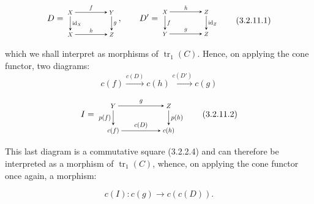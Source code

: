 \begin{equation}
  \begin{gathered}
  D=
  \begin{tikzpicture}[>=stealth,baseline=(current bounding box.center),scale=0.68,
    every node/.style={transform shape}]
    \node (X1) at (0,1.35) {$X$}; \node (Y) at (2.5,1.35) {$Y$};
    \node (X2) at (0,0) {$X$}; \node (Z) at (2.5,0) {$Z$};
    \draw[->] (X1) -- node[above] {$f$} (Y);
    \draw[->] (X1) -- node[right] {$\operatorname{id}_X$} (X2);
    \draw[->] (Y) -- node[right] {$g$} (Z);
    \draw[->] (X2) -- node[above] {$h$} (Z);
  \end{tikzpicture},
  \qquad
  D'=
  \begin{tikzpicture}[>=stealth,baseline=(current bounding box.center),scale=0.68,
    every node/.style={transform shape}]
    \node (X) at (0,1.35) {$X$}; \node (Z1) at (2.5,1.35) {$Z$};
    \node (Y) at (0,0) {$Y$}; \node (Z2) at (2.5,0) {$Z$};
    \draw[->] (X) -- node[above] {$h$} (Z1);
    \draw[->] (X) -- node[right] {$f$} (Y);
    \draw[->] (Z1) -- node[right] {$\operatorname{id}_Z$} (Z2);
    \draw[->] (Y) -- node[above] {$g$} (Z2);
  \end{tikzpicture}
  \end{gathered}
  \tag{3.2.11.1}
\end{equation}

which we shall interpret as morphisms of $\operatorname{tr}_1(C)$. Hence,
on applying the cone functor, two diagrams:
\[
  c(f)\xrightarrow{c(D)}c(h)\xrightarrow{c(D')}c(g)
\]

\begin{equation}
  I=
  \begin{tikzpicture}[>=stealth,baseline=(current bounding box.center),scale=0.76,
    every node/.style={transform shape}]
    \node (Y) at (0,1.35) {$Y$}; \node (Z) at (3.0,1.35) {$Z$};
    \node (Cf) at (0,0) {$c(f)$}; \node (Ch) at (3.0,0) {$c(h)$};
    \draw[->] (Y) -- node[above] {$g$} (Z);
    \draw[->] (Y) -- node[left] {$p(f)$} (Cf);
    \draw[->] (Z) -- node[right] {$p(h)$} (Ch);
    \draw[->] (Cf) -- node[above] {$c(D)$} (Ch);
  \end{tikzpicture}
  \tag{3.2.11.2}
\end{equation}

This last diagram is a commutative square (3.2.2.4) and can therefore be
interpreted as a morphism of $\operatorname{tr}_1(C)$, whence, on applying
the cone functor once again, a morphism:

\begin{equation}
  c(I)\colon c(g)\longrightarrow c(c(D)).
  \tag{3.2.11.3}
\end{equation}
\endgroup
